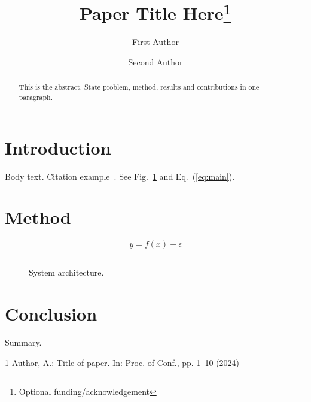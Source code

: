 \documentclass[runningheads]{llncs}
\begin{document}
\title{Paper Title Here\thanks{Optional funding/acknowledgement}}

\author{First Author \and
Second Author}


\maketitle

\begin{abstract}
This is the abstract. State problem, method, results and contributions in one paragraph.
\end{abstract}

\section{Introduction}
Body text. Citation example~\cite{ref1}. See Fig.~\ref{fig:arch} and Eq.~(\ref{eq:main}).

\section{Method}
\begin{equation}\label{eq:main}
  y = f(x) + \epsilon
\end{equation}

\begin{figure}[t]
  \centering
  \rule{0.6\textwidth}{3cm}   %
  \caption{System architecture.}
  \label{fig:arch}
\end{figure}

\section{Conclusion}
Summary.


% 
\begin{thebibliography}{1}
Author, A.: Title of paper. In: Proc. of Conf., pp. 1--10 (2024)
\end{thebibliography}
\end{document}
